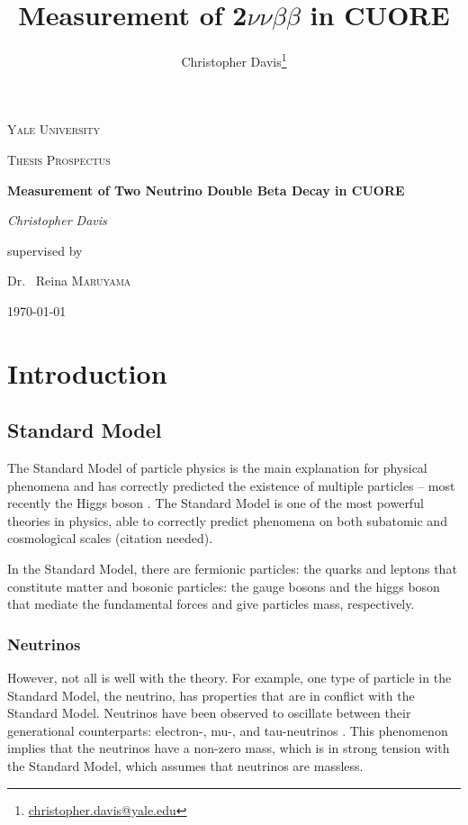 \documentclass[12pt,a4paper]{article}
\author{Christopher Davis\thanks{\url{christopher.davis@yale.edu}}}
\title{Measurement of 2$\nu\nu\beta\beta$ in CUORE}
\begin{document}
\begin{titlepage}
\centering

{\scshape\LARGE Yale University \par}
\vspace{1 cm}
{\scshape\Large Thesis Prospectus \par}
\vspace{1.5 cm}
{\huge\bfseries Measurement of Two Neutrino Double Beta Decay in CUORE \par}
\vspace{2 cm}
{\Large\itshape Christopher Davis \par}
\vfill
supervised by \par
Dr. ~Reina \textsc{Maruyama}

\vfill
{\large \today \par}
\end{titlepage}

\tableofcontents

\doublespacing

\section{Introduction}

\subsection{Standard Model}
The Standard Model of particle physics is the main explanation for physical phenomena and has correctly predicted the existence of multiple particles -- most recently the Higgs boson \cite{Higgs-ATLAS}\cite{Higgs-CMS}. The Standard Model is one of the most powerful theories in physics, able to correctly predict phenomena on both subatomic and cosmological scales (\color{blue}citation needed\color{black}).

In the Standard Model, there are fermionic particles: the quarks and leptons that constitute matter and bosonic particles: the gauge bosons and the higgs boson that mediate the fundamental forces and give particles mass, respectively. 

\subsubsection{Neutrinos}

However, not all is well with the theory. For example, one type of particle in the Standard Model, the neutrino, has properties that are in conflict with the Standard Model. Neutrinos have been observed to oscillate between their generational counterparts: electron-, mu-, and tau-neutrinos \cite{Homestake Neutrino}\cite{Super-K}\cite{Sudbury Neutrino}. This phenomenon implies that the neutrinos have a non-zero mass, which is in strong tension with the Standard Model, which assumes that neutrinos are massless.
\end{document}
